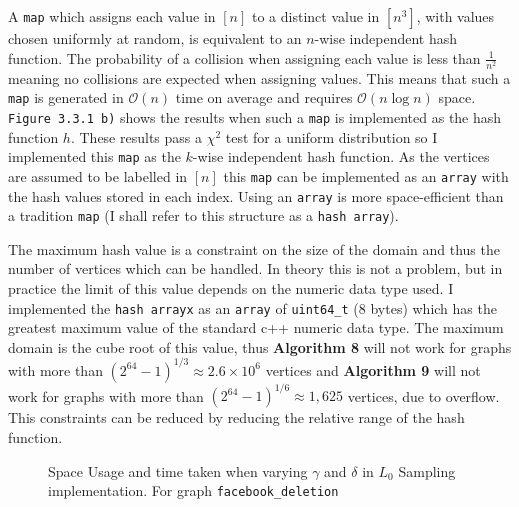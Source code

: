 \documentclass[11pt,twoside,a4paper]{report}
\begin{document}
\par A \texttt{map} which assigns each value in $[n]$ to a distinct value in $[n^3]$, with values chosen uniformly at random, is equivalent to an $n$-wise independent hash function. The probability of a collision when assigning each value is less than $\frac1{n^2}$ meaning no collisions are expected when assigning values. This means that such a \texttt{map} is generated in $\mathcal{O}(n)$ time on average and requires $\mathcal{O}(n\log n)$ space. \texttt{Figure 3.3.1 b)} shows the results when such a \texttt{map} is implemented as the hash function $h$. These results pass a $\chi^2$ test for a uniform distribution so I implemented this \texttt{map} as the $k$-wise independent hash function. As the vertices are assumed to be labelled in $[n]$ this \texttt{map} can be implemented as an \texttt{array} with the hash values stored in each index. Using an \texttt{array} is more space-efficient than a tradition \texttt{map} (I shall refer to this structure as a \texttt{hash array}).

\par The maximum hash value is a constraint on the size of the domain and thus the number of vertices which can be handled. In theory this is not a problem, but in practice the limit of this value depends on the numeric data type used. I implemented the \texttt{hash arrayx} as an \texttt{array} of \texttt{uint64\_t} (8 bytes) which has the greatest maximum value of the standard c++ numeric data type. The maximum domain is the cube root of this value, thus \textbf{Algorithm 8} will not work for graphs with more than $(2^{64}-1)^{1/3}\approx2.6\times10^6$ vertices and \textbf{Algorithm 9} will not work for graphs with more than $(2^{64}-1)^{1/6}\approx1,625$ vertices, due to overflow. This constraints can be reduced by reducing the relative range of the hash function.

\begin{figure}[H]
	\label{Figure 14}
	\caption{Space Usage and time taken when varying $\gamma$ and $\delta$ in $L_0$ Sampling implementation. For graph \texttt{facebook\_deletion}}
\end{figure}
\end{document}
